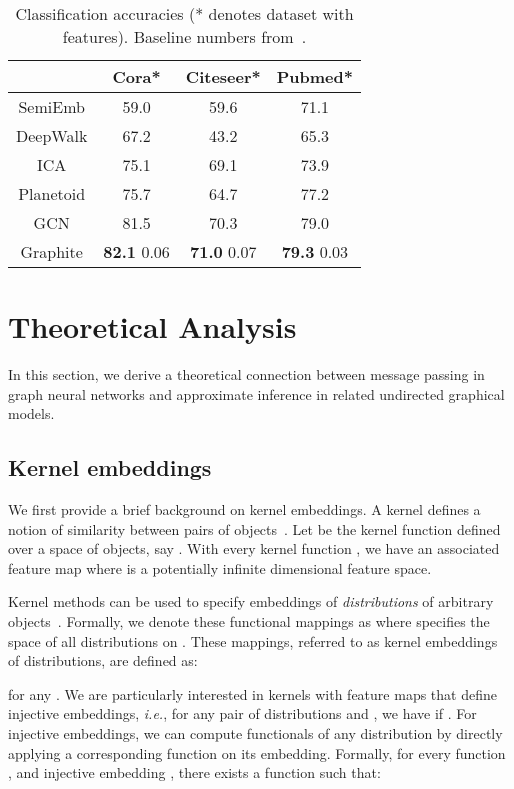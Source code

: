 \documentclass{article}
\begin{document}
\begin{table}[t]
\centering
  \caption{Classification accuracies (* denotes dataset with features). Baseline numbers from~\citet{kipf2016semi}.}
  \label{table-acc}
  \centering
\vspace{0.05in}
  \begin{tabular}{|c|c|c|c|}
    \toprule
	& Cora* & Citeseer* & Pubmed* \\
    \midrule
    SemiEmb & 59.0 & 59.6 & 71.1 \\
    DeepWalk & 67.2 & 43.2 & 65.3 \\
    ICA & 75.1 & 69.1 & 73.9 \\
    Planetoid & 75.7 & 64.7 & 77.2 \\
    GCN & 81.5 & 70.3 & 79.0\\ \midrule
    Graphite & \textbf{82.1}  0.06 & \textbf{71.0}  0.07 & \textbf{79.3}  0.03\\
    \bottomrule
  \end{tabular}
\end{table}
 
\section{ Theoretical Analysis}\label{sec:interpret}

In this section, we derive a theoretical connection between message passing in graph neural networks and approximate inference in related undirected graphical models. 

\subsection{Kernel embeddings}
We first provide a brief background on kernel embeddings.
A kernel defines a notion of similarity between pairs of objects~\citep{scholkopf2002learning,shawe2004kernel}.
Let  be the kernel function defined over a space of objects, say . 
With every kernel function , we have an associated feature map  where  is a potentially infinite dimensional feature space.


Kernel methods can be used to specify embeddings of \textit{distributions} of arbitrary objects~\citep{smola2007hilbert,gretton2007kernel}. 
Formally, we denote these functional mappings as  where  specifies the space of all distributions on . 
These mappings, referred to as kernel embeddings of distributions, are defined as:

for any .
We are particularly interested in kernels with feature maps  that define injective embeddings, \textit{i.e.}, for any pair of distributions  and , we have  if . 
For injective embeddings, 
we can compute functionals of any distribution by directly applying a corresponding function on its embedding. Formally, for every function ,  and injective embedding , there exists a function  such that:
\end{document}
